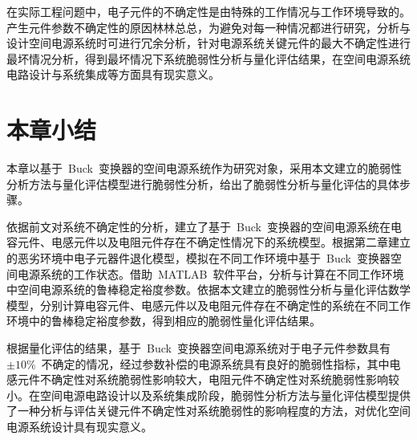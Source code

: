 在实际工程问题中，电子元件的不确定性是由特殊的工作情况与工作环境导致的。产生元件参数不确定性的原因林林总总，为避免对每一种情况都进行研究，分析与设计空间电源系统时可进行冗余分析，针对电源系统关键元件的最大不确定性进行最坏情况分析，得到最坏情况下系统脆弱性分析与量化评估结果，在空间电源系统电路设计与系统集成等方面具有现实意义。
\section{本章小结}
\label{sec:chap5:sum}
本章以基于~Buck~变换器的空间电源系统作为研究对象，采用本文建立的脆弱性分析方法与量化评估模型进行脆弱性分析，给出了脆弱性分析与量化评估的具体步骤。

依据前文对系统不确定性的分析，建立了基于~Buck~变换器的空间电源系统在电容元件、电感元件以及电阻元件存在不确定性情况下的系统模型。根据第二章建立的恶劣环境中电子元器件退化模型，模拟在不同工作环境中基于~Buck~变换器空间电源系统的工作状态。借助~MATLAB~软件平台，分析与计算在不同工作环境中空间电源系统的鲁棒稳定裕度参数。依据本文建立的脆弱性分析与量化评估数学模型，分别计算电容元件、电感元件以及电阻元件存在不确定性的系统在不同工作环境中的鲁棒稳定裕度参数，得到相应的脆弱性量化评估结果。

根据量化评估的结果，基于~Buck~变换器空间电源系统对于电子元件参数具有~$\pm10\%$~不确定的情况，经过参数补偿的电源系统具有良好的脆弱性指标，其中电感元件不确定性对系统脆弱性影响较大，电阻元件不确定性对系统脆弱性影响较小。在空间电源电路设计以及系统集成阶段，脆弱性分析方法与量化评估模型提供了一种分析与评估关键元件不确定性对系统脆弱性的影响程度的方法，对优化空间电源系统设计具有现实意义。